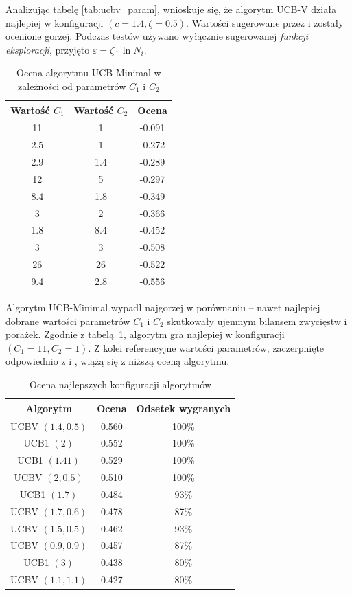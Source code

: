 \documentclass[a4paper,12pt]{article}
\begin{document}
Analizując tabelę \ref{tab:ucbv_param}, wnioskuje się, że algorytm UCB-V działa najlepiej w konfiguracji $(c=1.4, \zeta=0.5)$. Wartości sugerowane przez \cite{tron} i \cite{ucbv} zostały ocenione gorzej. Podczas testów używano wyłącznie sugerowanej \textit{funkcji eksploracji}, przyjęto $\varepsilon=\zeta \cdot \ln N_i$.\\

\begin{table}[!h]
	\centering
	\begin{tabular}{|c|c|c|} \hline
		Wartość $C_1$ & Wartość $C_2$ & Ocena \\ \hline
		11 & 1 & 	-0.091 \\ \hline
		\rowcolor{teal} 2.5 & 1 & 	-0.272 \\ \hline
		2.9 & 1.4 & 	-0.289 \\ \hline
		12 & 5 & 	-0.297 \\ \hline
		\rowcolor{teal} 8.4 & 1.8 & 	-0.349 \\ \hline
		3 & 2 & 	-0.366 \\ \hline
		1.8 & 8.4 & 	-0.452 \\ \hline
		3 & 3 & 	-0.508 \\ \hline
		26 & 26 & 	-0.522 \\ \hline
		9.4 & 2.8 & 	-0.556 \\ \hline
	\end{tabular}
	\caption{Ocena algorytmu UCB-Minimal w zależności od parametrów $C_1$ i $C_2$}
	\label{tab:ucbm_param}
\end{table}

Algorytm UCB-Minimal wypadł najgorzej w porównaniu -- nawet najlepiej dobrane wartości parametrów $C_1$ i $C_2$ skutkowały ujemnym bilansem zwycięstw i porażek. Zgodnie z tabelą~\ref{tab:ucbm_param}, algorytm gra najlepiej w konfiguracji $(C_1 = 11, C_2 = 1)$. Z kolei referencyjne wartości parametrów, zaczerpnięte odpowiednio z \cite{ucbminimal} i \cite{tron}, wiążą się z niższą oceną algorytmu.

\clearpage

\begin{table}[!h]
	\centering
	\begin{tabular}{|c|c|c|} \hline
		Algorytm & Ocena & Odsetek wygranych \\ \hline
		UCBV $(1.4, 0.5)$ &	0.560 & 100\%\\ \hline
		UCB1 $(2)$ &	0.552 & 100\% \\ \hline
		UCB1 $(1.41)$ &	0.529 & 100\% \\ \hline
		UCBV $(2, 0.5)$ &	0.510 & 100\%\\ \hline
		UCB1 $(1.7)$ &	0.484 & 93\%\\ \hline
		UCBV $(1.7, 0.6)$ &	0.478 & 87\%\\ \hline
		UCBV $(1.5, 0.5)$ &	0.462 & 93\%\\ \hline
		UCBV $(0.9, 0.9)$ &	0.457 & 87\%\\ \hline
		UCB1 $(3)$ &	0.438 & 80\%\\ \hline
		UCBV $(1.1, 1.1)$ &	0.427 & 80\%\\ \hline
	\end{tabular}
	\caption{Ocena najlepszych konfiguracji algorytmów}
	\label{tab:all_params}
\end{table}
\end{document}
